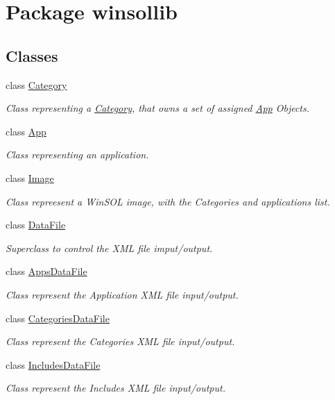\hypertarget{namespacewinsollib}{
\section{Package winsollib}
\label{namespacewinsollib}
}


\subsection*{Classes}
\begin{CompactItemize}
\item 
class \hyperlink{classwinsollib_1_1Category}{Category}
\begin{CompactList}\small\item\em Class representing a \hyperlink{classwinsollib_1_1Category}{Category}, that owns a set of assigned \hyperlink{classwinsollib_1_1App}{App} Objects. \item\end{CompactList}\item 
class \hyperlink{classwinsollib_1_1App}{App}
\begin{CompactList}\small\item\em Class representing an application. \item\end{CompactList}\item 
class \hyperlink{classwinsollib_1_1Image}{Image}
\begin{CompactList}\small\item\em Class repreesent a Win\-SOL image, with the Categories and applications list. \item\end{CompactList}\item 
class \hyperlink{classwinsollib_1_1DataFile}{Data\-File}
\begin{CompactList}\small\item\em Superclass to control the XML file imput/output. \item\end{CompactList}\item 
class \hyperlink{classwinsollib_1_1AppsDataFile}{Apps\-Data\-File}
\begin{CompactList}\small\item\em Class represent the Application XML file input/output. \item\end{CompactList}\item 
class \hyperlink{classwinsollib_1_1CategoriesDataFile}{Categories\-Data\-File}
\begin{CompactList}\small\item\em Class represent the Categories XML file input/output. \item\end{CompactList}\item 
class \hyperlink{classwinsollib_1_1IncludesDataFile}{Includes\-Data\-File}
\begin{CompactList}\small\item\em Class represent the Includes XML file input/output. \item\end{CompactList}\end{CompactItemize}
